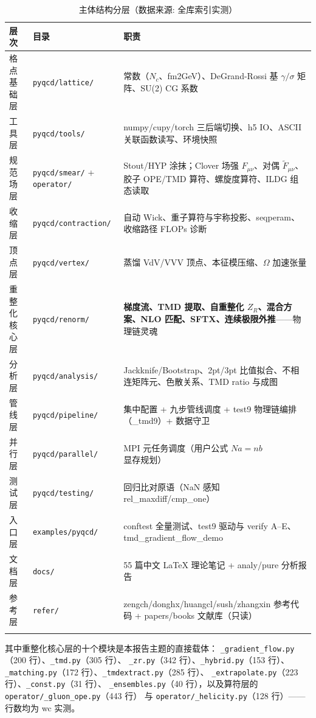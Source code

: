 \documentclass[UTF8]{ctexart}
\begin{document}
\begin{xltabular}{\textwidth}{llX}
\toprule
\textcolor{struct}{层次} & 目录 & 职责 \\
\midrule
\endhead
格点基础层 & \texttt{pyqcd/lattice/} & 常数（$N_c$、fm2GeV）、DeGrand-Rossi 基 $\gamma/\sigma$ 矩阵、SU(2) CG 系数 \\
工具层 & \texttt{pyqcd/tools/} & numpy/cupy/torch 三后端切换、h5 IO、ASCII 关联函数读写、环境快照 \\
规范场层 & \texttt{pyqcd/smear/} + \texttt{operator/} & Stout/HYP 涂抹；Clover 场强 $F_{\mu\nu}$、对偶 $\tilde F_{\mu\nu}$、胶子 OPE/TMD 算符、螺旋度算符、ILDG 组态读取 \\
收缩层 & \texttt{pyqcd/contraction/} & 自动 Wick、重子算符与宇称投影、seqperam、收缩路径 FLOPs 诊断 \\
顶点层 & \texttt{pyqcd/vertex/} & 蒸馏 VdV/VVV 顶点、本征模压缩、$\Omega$ 加速张量 \\
\textcolor{struct}{重整化核心层} & \texttt{pyqcd/renorm/} & \textbf{梯度流、TMD 提取、自重整化 $Z_R$、混合方案、NLO 匹配、SFTX、连续极限外推}——物理链灵魂 \\
分析层 & \texttt{pyqcd/analysis/} & Jackknife/Bootstrap、2pt/3pt 比值拟合、不相连矩阵元、色散关系、TMD ratio 与成图 \\
管线层 & \texttt{pyqcd/pipeline/} & 集中配置 + 九步管线调度 + test9 物理链编排（\_tmd9）+ 数据守卫 \\
并行层 & \texttt{pyqcd/parallel/} & MPI 元任务调度（用户公式 $N a = n b$ 显存规划） \\
测试层 & \texttt{pyqcd/testing/} & 回归比对原语（NaN 感知 rel\_maxdiff/cmp\_one） \\
入口层 & \texttt{examples/pyqcd/} & conftest 全量测试、test9 驱动与 verify A--E、tmd\_gradient\_flow\_demo \\
文档层 & \texttt{docs/} & 55 篇中文 LaTeX 理论笔记 + analy/pure 分析报告 \\
参考层 & \texttt{refer/} & zengch/donghx/huangcl/sush/zhangxin 参考代码 + papers/books 文献库（只读） \\
\bottomrule
\caption{主体结构分层（数据来源: 全库索引实测）}
\end{xltabular}

其中重整化核心层的十个模块是本报告主题的直接载体：
\texttt{\_gradient\_flow.py}（200 行）、\texttt{\_tmd.py}（305 行）、
\texttt{\_zr.py}（342 行）、\texttt{\_hybrid.py}（153 行）、
\texttt{\_matching.py}（172 行）、\texttt{\_tmdextract.py}（285 行）、
\texttt{\_extrapolate.py}（223 行）、\texttt{\_const.py}（31 行）、
\texttt{\_ensembles.py}（40 行），以及算符层的 \texttt{operator/\_gluon\_ope.py}（443 行）
与 \texttt{operator/\_helicity.py}（128 行）——行数均为 wc 实测。
\end{document}
